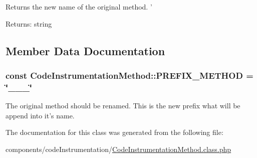 Returns the new name of the original method. ' \begin{Desc}
\item[Returns:]string \end{Desc}


\subsection{Member Data Documentation}
\hypertarget{class_code_instrumentation_method_fb4c19a6fcdb8dbcaff2d8e5c4dbe9fe}{
\subsubsection[{PREFIX\_\-METHOD}]{\setlength{\rightskip}{0pt plus 5cm}const {\bf CodeInstrumentationMethod::PREFIX\_\-METHOD} = \char`\"{}\_\-\_\-\_\-\char`\"{}}}
\label{class_code_instrumentation_method_fb4c19a6fcdb8dbcaff2d8e5c4dbe9fe}


The original method should be renamed. This is the new prefix what will be append into it's name. 

The documentation for this class was generated from the following file:\begin{CompactItemize}
\item 
components/codeInstrumentation/\hyperlink{_code_instrumentation_method_8class_8php}{CodeInstrumentationMethod.class.php}\end{CompactItemize}
